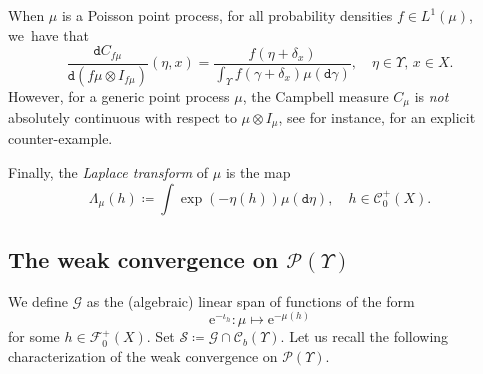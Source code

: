 \documentclass[10pt]{amsart}
\theoremstyle{definition}
\theoremstyle{remark}
\begin{document}
When $\mu$ is a Poisson point process, for all probability densities $f \in L^{1}(\mu)$, we~have that
\begin{equation}\label{e:campbell-density}
\frac{\mathtt{d} C_{f\mu}}{\mathtt{d} (f\mu \otimes I_{f\mu})}(\eta, x) = \frac{f(\eta + \delta_{x})}{\int_{\varUpsilon} f(\gamma + \delta_{x}) \mu(\mathtt{d} \gamma)}, \quad \eta \in \varUpsilon,\, x \in X.
\end{equation}
However, for a generic point process $\mu$, the Campbell measure $C_{\mu}$ is \emph{not} absolutely continuous with respect to $\mu \otimes I_{\mu}$, see for instance, \cite{OsadaShirai} for an explicit counter-example.

Finally, the \emph{Laplace transform} of $\mu$ is the map
\begin{equation*}
\Lambda_{\mu}(h) \coloneq \int \exp(- \eta(h)) \mu(\mathtt{d} \eta), \quad h \in \mathscr{C}^{+}_{0}(X).
\end{equation*}

\subsection{The weak convergence \texorpdfstring{on $\mathscr{P}(\varUpsilon)$}{of point processes}}
We define $\mathscr{G}$ as the (algebraic) linear span of functions of the form
\[
\mathrm{e}^{-\iota_{h}}\colon \mu \longmapsto \mathrm{e}^{-\mu(h)}
\]
for some $h \in \mathscr{F}^{+}_{0}(X)$.
Set $\mathscr{S} \coloneq \mathscr{G} \cap \mathscr{C}_{b}(\varUpsilon)$.
Let us recall the following characterization of the weak convergence on $\mathscr{P}(\varUpsilon)$.
\end{document}
